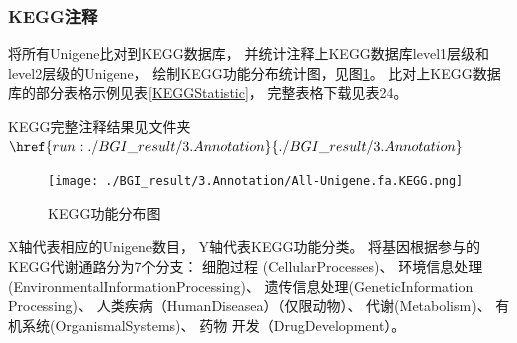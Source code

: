 \documentclass[10pt, oneside,a4paper]{article}
\begin{document}
\subsubsection{KEGG注释}
将所有Unigene比对到KEGG数据库， 并统计注释上KEGG数据库level1层级和level2层级的Unigene，
绘制KEGG功能分布统计图，见图\ref{KEGG}。 比对上KEGG数据库的部分表格示例见表\ref{KEGGStatistic}， 完整表格下载见表24。\par
KEGG完整注释结果见文件夹$\href{run:./BGI\_result/3.Annotation}{./BGI\_result/3.Annotation}$\par
\begin{table}[H]
\centering
{}
\end{table}

\begin{figure}[H]
\centering
\texttt{[image: ./BGI\_result/3.Annotation/All-Unigene.fa.KEGG.png]}
\par
\renewcommand{\figurename}{图}
\caption{KEGG功能分布图}
\label{KEGG}
\end{figure}
\begin{center}
X轴代表相应的Unigene数目， Y轴代表KEGG功能分类。 将基因根据参与的KEGG代谢通路分为7个分支： 细胞过程
(CellularProcesses)、 环境信息处理(EnvironmentalInformationProcessing)、 遗传信息处理(GeneticInformation
Processing)、 人类疾病（HumanDiseasea）（仅限动物）、 代谢(Metabolism)、 有机系统(OrganismalSystems)、 药物
开发（DrugDevelopment）。
\end{center}
\end{document}
